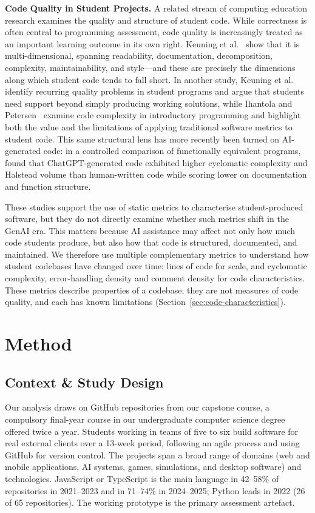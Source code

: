 \documentclass[sigconf,authorversion]{acmart}
\newcommand{\todo}[1]{#1}
\begin{document}
\textbf{Code Quality in Student Projects.}
A related stream of computing education research examines the quality and structure of student code. While correctness is often central to programming assessment, code quality is increasingly treated as an important learning outcome in its own right. Keuning et al.~\cite{keuning2023systematic} show that it is multi-dimensional, spanning readability, documentation, decomposition, complexity, maintainability, and style---and these are precisely the dimensions along which student code tends to fall short. In another study, Keuning et al.~\cite{keuning2017code} identify recurring quality problems in student programs and argue that students need support beyond simply producing working solutions, while Ihantola and Petersen~\cite{ihantola2019code} examine code complexity in introductory programming and highlight both the value and the limitations of applying traditional software metrics to student code. This same structural lens has more recently been turned on AI-generated code: in a controlled comparison of functionally equivalent programs, \citet{azeem2025ai} found that ChatGPT-generated code exhibited higher cyclomatic complexity and Halstead volume than human-written code while scoring lower on documentation and function structure.

These studies support the use of static metrics to characterise student-produced software, but they do not directly examine whether such metrics shift in the GenAI era. This matters because AI assistance may affect not only how much code students produce, but also how that code is structured, documented, and maintained. We therefore use multiple complementary metrics to understand how student codebases have changed over time: lines of code for scale, and cyclomatic complexity, error-handling density and comment density for code characteristics. These metrics describe properties of a codebase; they are not measures of code quality, and each has known limitations (Section~\ref{sec:code-characteristics}).

\section{Method}
\subsection{Context \& Study Design}
\label{secn:context_study_design}
Our analysis draws on GitHub repositories from our capstone course, a compulsory final-year course in our undergraduate computer science degree offered twice a year. Students working in teams of five to six build software for real external clients over a 13-week period, following an agile process and using GitHub for version control. The projects span a broad range of domains (web and mobile applications, AI systems, games, simulations, and desktop software) and technologies. \todo{JavaScript or TypeScript is the main language in 42--58\% of repositories in 2021--2023 and in 71--74\% in 2024--2025; Python leads in 2022 (26 of 65 repositories).} The working prototype is the primary assessment artefact.
\end{document}
